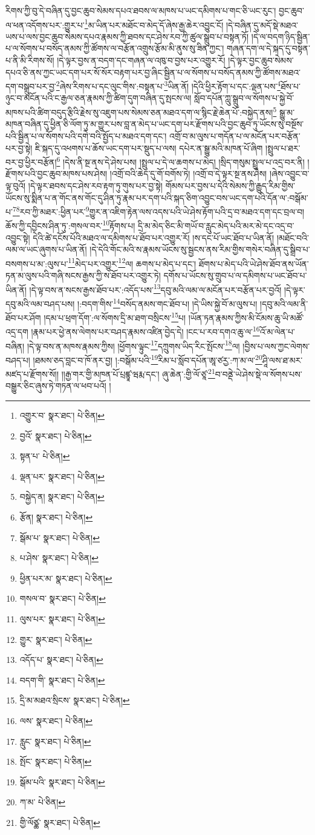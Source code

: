 རིགས་ཀྱི་བུ་དེ་བཞིན་དུ་བྱང་ཆུབ་སེམས་དཔའ་ཐབས་ལ་མཁས་པ་ཡང་དམིགས་པ་གང་ཅི་ཡང་རུང་། བྱང་ཆུབ་ལ་ཕན་འདོགས་པར་:གྱུར་པ་\footnote{འགྱུར་བ་  སྣར་ཐང་།  པེ་ཅིན། }མ་ཡིན་པར་མཐོང་བ་མེད་དོ་ཞེས་རྒྱ་ཆེར་འབྱུང་ངོ། །དེ་བཞིན་དུ་མདོ་སྡེ་མཐའ་ཡས་པ་ལས་བྱང་ཆུབ་སེམས་དཔའ་རྣམས་ཀྱི་ཐབས་དང་ཤེས་རབ་ཀྱི་ཚུལ་སྒྲུབ་པ་བསྟན་ཏོ། །དེ་ལ་བདག་ཉིད་སྦྱིན་པ་ལ་སོགས་པ་བསོད་ནམས་ཀྱི་ཚོགས་ལ་བརྩོན་འགྲུས་རྩོམ་མི་ནུས་སུ་ཟིན་ཀྱང་། གཞན་དག་ལ་དེ་སྐད་དུ་བསྟན་པ་ནི་མི་རིགས་སོ། །དེ་ལྟར་བྱས་ན་བདག་དང་གཞན་ལ་འཁུ་བ་བྱས་པར་འགྱུར་རོ། །དེ་ལྟར་བྱང་ཆུབ་སེམས་དཔའ་ཅི་ནས་ཀྱང་ཡང་དག་པར་སོ་སོར་བརྟག་པར་བྱ་ཞིང་སྦྱིན་པ་ལ་སོགས་པ་བསོད་ནམས་ཀྱི་ཚོགས་མཐའ་དག་བསྒྲུབ་པར་བྱ་\footnote{བྱའོ་  སྣར་ཐང་།  པེ་ཅིན། }ཞེས་རིགས་པ་དང་ལུང་གིས་:བསྟན་པ་\footnote{སྟན་པ་  པེ་ཅིན། }ཡིན་ནོ། །དེའི་ཕྱིར་རྟོག་པ་དང་:ལྡན་པས་\footnote{ལྡན་པར་  སྣར་ཐང་།  པེ་ཅིན། }ཐོས་པ་ཉུང་བ་མངོན་པའི་ང་རྒྱལ་ཅན་རྣམས་ཀྱི་ཚིག་དུག་བཞིན་དུ་སྤངས་ལ། སློབ་དཔོན་ཀླུ་སྒྲུབ་ལ་སོགས་པ་སྐྱེ་བོ་མཁས་པའི་ཚིག་བདུད་རྩིའི་རྗེས་སུ་འཇུག་པས་སེམས་ཅན་མཐའ་དག་ལ་སྙིང་རྗེ་ཆེན་པོ་:བསྐྱེད་ནས།\footnote{བསྐྱེད་ན།  སྣར་ཐང་།  པེ་ཅིན། } སྒྱུ་མ་མཁན་བཞིན་དུ་ཕྱིན་ཅི་ལོག་ཏུ་མ་གྱུར་པས་བླ་ན་མེད་པ་ཡང་དག་པར་རྫོགས་པའི་བྱང་ཆུབ་ཏུ་ཡོངས་སུ་བསྔོས་པའི་སྦྱིན་པ་ལ་སོགས་པའི་དགེ་བའི་སྤྱོད་པ་མཐའ་དག་དང་། འགྲོ་བ་མ་ལུས་པ་གདོན་པ་ལ་མངོན་པར་བརྩོན་པར་བྱ་སྟེ། ཇི་སྐད་དུ་འཕགས་པ་ཆོས་ཡང་དག་པར་སྡུད་པ་ལས། དཔེར་ན་སྒྱུ་མའི་མཁན་པོ་ཞིག །སྤྲུལ་པ་ཐར་བར་བྱ་ཕྱིར་བརྩོན།\footnote{རྩོན།  སྣར་ཐང་།  པེ་ཅིན། } །དེས་ནི་སྔ་ནས་དེ་ཤེས་པས། །སྤྲུལ་པ་དེ་ལ་ཆགས་པ་མེད། །སྲིད་གསུམ་སྤྲུལ་པ་འདྲ་བར་ནི། །རྫོགས་པའི་བྱང་ཆུབ་མཁས་པས་ཤེས། །འགྲོ་བའི་ཆེད་དུ་གོ་བགོས་ཏེ། །འགྲོ་བ་དེ་ལྟར་སྔ་ནས་ཤེས། །ཞེས་འབྱུང་བ་ལྟ་བུའོ། །དེ་ལྟར་ཐབས་དང་ཤེས་རབ་རྟག་ཏུ་གུས་པར་བྱ་སྟེ། གོམས་པར་བྱས་པ་དེའི་སེམས་ཀྱི་རྒྱུད་རིམ་གྱིས་ཡོངས་སུ་སྨིན་པ་ན་གོང་ནས་གོང་དུ་ཤིན་ཏུ་རྣམ་པར་དག་པའི་སྐད་ཅིག་འབྱུང་བས་ཡང་དག་པའི་དོན་ལ་:བསྒོམ་པ་\footnote{སྒོམ་པ་  སྣར་ཐང་།  པེ་ཅིན། }\footnote{པ་ཤེས་  སྣར་ཐང་།  པེ་ཅིན། }རབ་ཀྱི་མཐར་:ཕྱིན་པར་\footnote{ཕྱིན་པར་མ་  སྣར་ཐང་།  པེ་ཅིན། }གྱུར་ན་འཇིག་རྟེན་ལས་འདས་པའི་ཡེ་ཤེས་རྟོག་པའི་དྲ་བ་མཐའ་དག་དང་བྲལ་བ། ཆོས་ཀྱི་དབྱིངས་ཤིན་ཏུ་:གསལ་བར་\footnote{གསལ་བ་  སྣར་ཐང་།  པེ་ཅིན། }རྟོགས་པ། དྲི་མ་མེད་ཅིང་མི་གཡོ་བ་རླུང་མེད་པའི་མར་མེ་དང་འདྲ་བ་འབྱུང་སྟེ། དེའི་ཚེ་དངོས་པོའི་མཐའ་ལ་དམིགས་པ་ཐོབ་པར་འགྱུར་རོ། །ས་དང་པོ་ཡང་ཐོབ་པ་ཡིན་ནོ། །མཐོང་བའི་ལམ་ལ་ཡང་ཞུགས་པ་ཡིན་ནོ། །དེ་དེའི་གོང་མའི་ས་རྣམས་ཡོངས་སུ་སྦྱངས་ནས་རིམ་གྱིས་གསེར་བཞིན་དུ་སྒྲིབ་པ་བསགས་པ་མ་:ལུས་པ་\footnote{ལུས་པར་  སྣར་ཐང་།  པེ་ཅིན། }མེད་པར་འགྱུར་\footnote{གྱུར་  སྣར་ཐང་།  པེ་ཅིན། }ལ། ཆགས་པ་མེད་པ་དང་། ཐོགས་པ་མེད་པའི་ཡེ་ཤེས་ཐོབ་ནས་ཡོན་ཏན་མ་ལུས་པའི་གཞི་སངས་རྒྱས་ཀྱི་ས་ཐོབ་པར་འགྱུར་ཏེ། དགོས་པ་ཡོངས་སུ་གྲུབ་པ་ལ་དམིགས་པ་ཡང་ཐོབ་པ་ཡིན་ནོ། །དེ་ལྟ་བས་ན་སངས་རྒྱས་ཐོབ་པར་:འདོད་པས་\footnote{འདོད་པ་  སྣར་ཐང་།  པེ་ཅིན། }དབུ་མའི་ལམ་ལ་མངོན་པར་བརྩོན་པར་བྱའོ། །དེ་ལྟར་དབུ་མའི་ལམ་བཤད་པས། །:བདག་གིས་\footnote{བདག་གི་  སྣར་ཐང་།  པེ་ཅིན། }བསོད་ནམས་གང་ཐོབ་པ། །དེ་ཡིས་སྐྱེ་བོ་མ་ལུས་པ། །དབུ་མའི་ལམ་ནི་ཐོབ་པར་ཤོག །དམ་པ་ཕྲག་དོག་:ལ་སོགས་དྲི་མ་ཐག་བསྲིངས་\footnote{དྲི་མ་མཐའ་སྲིངས་  སྣར་ཐང་།  པེ་ཅིན། }པ། །ཡོན་ཏན་རྣམས་ཀྱིས་མི་ངོམས་ཆུ་ཡི་མཚོ་འདྲ་དག །རྣམ་པར་ཕྱེ་ནས་ལེགས་པར་བཤད་རྣམས་འཛིན་བྱེད་དེ། །ངང་པ་རབ་དགའ་ཆུ་ལ་\footnote{ལས་  སྣར་ཐང་།  པེ་ཅིན། }འོ་མ་ལེན་པ་བཞིན། །དེ་ལྟ་བས་ན་མཁས་རྣམས་ཀྱིས། །ཕྱོགས་ལྟུང་\footnote{རླུང་  སྣར་ཐང་།  པེ་ཅིན། }དཀྲུགས་ཡིད་རིང་སྤོངས་\footnote{སྤོང་  སྣར་ཐང་།  པེ་ཅིན། }ལ། །བྱིས་པ་ལས་ཀྱང་ལེགས་བཤད་པ། །ཐམས་ཅད་བླང་བ་ཁོ་ནར་བྱ། །:བསྒོམ་པའི་\footnote{སྒོམ་པའི་  སྣར་ཐང་།  པེ་ཅིན། }རིམ་པ་སློབ་དཔོན་ཨཱ་ཙརྱ་:ཀ་མ་ལ་\footnote{ཀ་མ་  པེ་ཅིན། }ཤཱི་ལས་ཐ་མར་མཛད་པ་རྫོགས་སོ།། །།རྒྱ་གར་གྱི་མཁན་པོ་པྲཛྙཱ་ཝརྨ་དང་། ཞུ་ཆེན་:གྱི་ལོ་ཙཱ་\footnote{གྱི་ལོཙྪ་  སྣར་ཐང་།  པེ་ཅིན། }བ་བནྡེ་ཡེ་ཤེས་སྡེ་ལ་སོགས་པས་བསྒྱུར་ཅིང་ཞུས་ཏེ་གཏན་ལ་ཕབ་པའོ། ། 